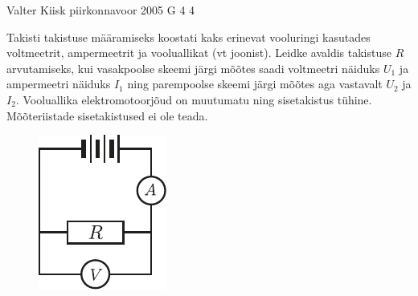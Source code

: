 \documentclass[11pt]{article}
\begin{document}
{%
{Valter Kiisk} %
{piirkonnavoor} %
{2005} %
{G 4} %
{4} %
{
\ifStatement
Takisti takistuse määramiseks koostati kaks erinevat vooluringi kasutades voltmeetrit, ampermeetrit ja vooluallikat (vt joonist). Leidke avaldis takistuse $R$ arvutamiseks, kui vasakpoolse skeemi järgi mõõtes saadi voltmeetri näiduks $U_1$ ja ampermeetri näiduks $I_1$ ning parempoolse skeemi järgi mõõtes aga vastavalt $U_2$ ja $I_2$. Vooluallika elektromotoorjõud on muutumatu ning sisetakistus tühine. Mõõteriistade sisetakistused ei ole teada.

\begin{figure}[h]
	\centering
	\begin{minipage}[b]{0.25\textwidth}
		\includegraphics[width=\linewidth]{2005-v2g-04-yl1}
	\end{minipage}
	\hspace{30pt}
	\begin{minipage}[b]{0.3\textwidth}

\end{minipage}
\end{figure}}}
\end{document}
